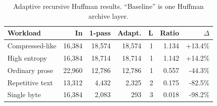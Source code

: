 \begin{table}[t]
\caption{Adaptive recursive Huffman results. ``Baseline'' is one Huffman archive layer.}
\label{tab:results}
\centering
\scriptsize
\begin{tabular*}{\columnwidth}{@{\extracolsep{\fill}}lrrrrrr@{}}
\toprule
Workload & In & 1-pass & Adapt. & L & Ratio & $\Delta$ \\
\midrule
Compressed-like & 16,384 & 18,574 & 18,574 & 1 & 1.134 & +13.4\% \\
High entropy & 16,384 & 18,714 & 18,714 & 1 & 1.142 & +14.2\% \\
Ordinary prose & 22,960 & 12,786 & 12,786 & 1 & 0.557 & -44.3\% \\
Repetitive text & 13,312 & 4,432 & 2,325 & 2 & 0.175 & -82.5\% \\
Single byte & 16,384 & 2,083 & 293 & 3 & 0.018 & -98.2\% \\
\bottomrule
\end{tabular*}
\end{table}
